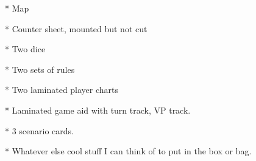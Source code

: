 \documentclass[10pt]{article}
\begin{document}
* Map

* Counter sheet, mounted but not cut

* Two dice

* Two sets of rules

* Two laminated player charts

* Laminated game aid with turn track, VP track.

* 3 scenario cards.

* Whatever else cool stuff I can think of to put in the box or bag.

\def\row[#1]{#1. & 1. & 2. & 3. & 4. & 5. & 6. & 7. & 8.\\[7pt]\hline}
\def\colwidth{2cm}
\def\cw{2cm}
\def\simovcol{p{\colwidth}}

\end{document}
